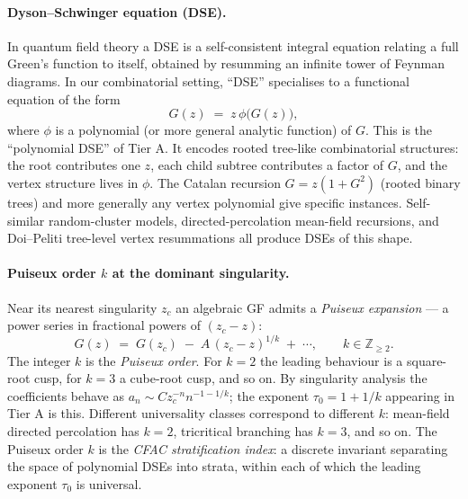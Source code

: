 \documentclass[10pt,a4paper,twocolumn]{article}
\theoremstyle{plain}
\theoremstyle{definition}
\begin{document}
\paragraph{Dyson--Schwinger equation (DSE).}
In quantum field theory a DSE is a self-consistent integral
equation relating a full Green's function to itself, obtained by
resumming an infinite tower of Feynman diagrams.  In our
combinatorial setting, ``DSE'' specialises to a functional
equation of the form
\[
  G(z) \;=\; z \, \phi\bigl(G(z)\bigr),
\]
where $\phi$ is a polynomial (or more general analytic function)
of $G$.  This is the ``polynomial DSE'' of Tier A.  It encodes
rooted tree-like combinatorial structures: the root contributes
one $z$, each child subtree contributes a factor of $G$, and the
vertex structure lives in $\phi$.  The Catalan recursion
$G = z(1 + G^2)$ (rooted binary trees) and more generally any
vertex polynomial give specific instances.  Self-similar
random-cluster models, directed-percolation mean-field
recursions, and Doi--Peliti tree-level vertex resummations all
produce DSEs of this shape.

\paragraph{Puiseux order $k$ at the dominant singularity.}
Near its nearest singularity $z_c$ an algebraic GF admits a
\emph{Puiseux expansion} --- a power series in fractional powers
of $(z_c - z)$:
\[
  G(z) \;=\; G(z_c) \;-\; A\,(z_c - z)^{1/k} \;+\; \cdots,
  \qquad k \in \mathbb{Z}_{\geq 2}.
\]
The integer $k$ is the \emph{Puiseux order}.  For $k = 2$ the
leading behaviour is a square-root cusp, for $k = 3$ a cube-root
cusp, and so on.  By singularity analysis the coefficients behave
as $a_n \sim C z_c^{-n} n^{-1 - 1/k}$; the exponent
$\tau_0 = 1 + 1/k$ appearing in Tier A is this.  Different
universality classes correspond to different $k$: mean-field
directed percolation has $k = 2$, tricritical branching has
$k = 3$, and so on.  The Puiseux order $k$ is the
\emph{CFAC stratification index}: a discrete invariant separating
the space of polynomial DSEs into strata, within each of which
the leading exponent $\tau_0$ is universal.
\end{document}

